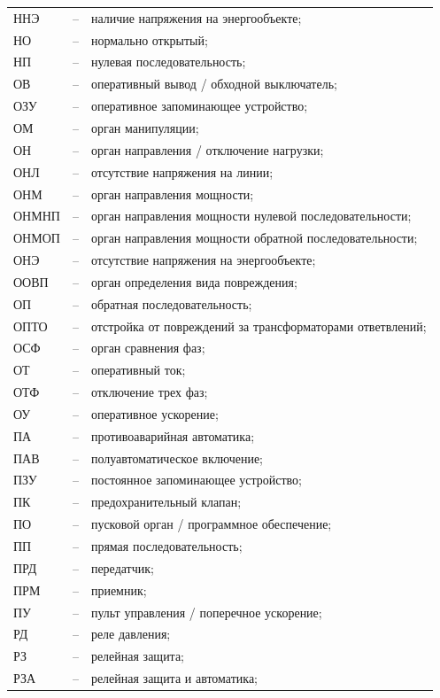 \begin{longtable}{>{\raggedright\arraybackslash}m{2cm}>{\raggedright\arraybackslash}m{0.5cm}>{\raggedright\arraybackslash}m{20cm}}
ННЭ & -- & наличие напряжения на энергообъекте; \\
НО & -- & нормально открытый; \\
НП & -- & нулевая последовательность; \\
ОВ & -- & оперативный вывод / обходной выключатель; \\
ОЗУ & -- & оперативное запоминающее устройство; \\
ОМ & -- & орган манипуляции; \\
ОН & -- & орган направления / отключение нагрузки; \\
ОНЛ & -- & отсутствие напряжения на линии; \\
ОНМ & -- & орган направления мощности; \\
ОНМНП & -- & орган направления мощности нулевой последовательности; \\
ОНМОП & -- & орган направления мощности обратной последовательности; \\
ОНЭ & -- & отсутствие напряжения на энергообъекте; \\
ООВП & -- & орган определения вида повреждения; \\
ОП & -- & обратная последовательность; \\
ОПТО & -- & отстройка от повреждений за трансформаторами ответвлений; \\
ОСФ & -- & орган сравнения фаз; \\
ОТ & -- & оперативный ток; \\
ОТФ & -- & отключение трех фаз; \\
ОУ & -- & оперативное ускорение; \\
ПА & -- & противоаварийная автоматика; \\
ПАВ & -- & полуавтоматическое включение; \\
ПЗУ & -- & постоянное запоминающее устройство; \\
ПК & -- & предохранительный клапан; \\
ПО & -- & пусковой орган / программное обеспечение; \\
ПП & -- & прямая последовательность; \\
ПРД & -- & передатчик; \\
ПРМ & -- & приемник; \\
ПУ & -- & пульт управления / поперечное ускорение; \\
РД & -- & реле давления; \\
РЗ & -- & релейная защита; \\
РЗА & -- & релейная защита и автоматика; \\

\end{longtable}

